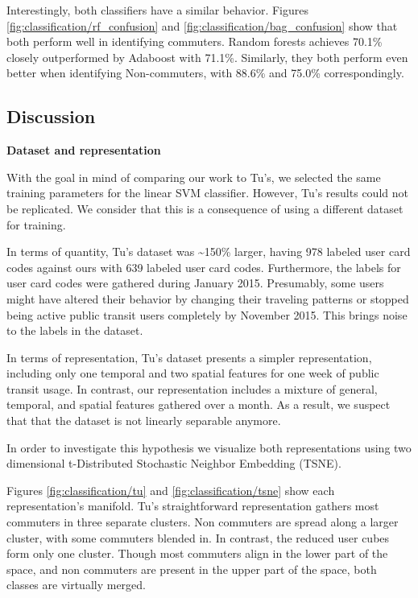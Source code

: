 \documentclass{article}
\begin{document}
Interestingly, both classifiers have a similar behavior. Figures \ref{fig:classification/rf_confusion} and \ref{fig:classification/bag_confusion} show that both perform well in identifying commuters. Random forests achieves 70.1\% closely outperformed by Adaboost with 71.1\%. Similarly, they both perform even better when identifying Non-commuters, with 88.6\% and 75.0\% correspondingly. 
 

\subsection{Discussion}

\textbf{Dataset and representation}


With the goal in mind of comparing our work to Tu's, we selected the same training parameters for the linear SVM classifier. However, Tu's results could not be replicated. We consider that this is a consequence of using a different dataset for training. 

In terms of quantity, Tu's dataset was \textasciitilde 150\% larger, having 978 labeled user card codes against ours with 639 labeled user card codes. Furthermore, the labels for user card codes were gathered during January 2015. Presumably, some users might have altered their behavior by changing their traveling patterns or stopped being active public transit users completely by November 2015. This brings noise to the labels in the dataset.

In terms of representation, Tu's dataset presents a simpler representation, including only one temporal and two spatial features for one week of public transit usage. In contrast, our representation includes a mixture of general, temporal, and spatial features gathered over a month. As a result, we suspect that that the dataset is not linearly separable anymore. 

In order to investigate this hypothesis we visualize both representations using two dimensional t-Distributed Stochastic Neighbor Embedding (TSNE). 

Figures \ref{fig:classification/tu} and \ref{fig:classification/tsne} show each representation's manifold. Tu's straightforward representation gathers most commuters in three separate clusters. Non commuters are spread along a larger cluster, with some commuters blended in.  In contrast, the reduced user cubes form only one cluster. Though most commuters align in the lower part of the space, and non commuters are present in the upper part of the space, both classes are virtually merged. 
\end{document}
